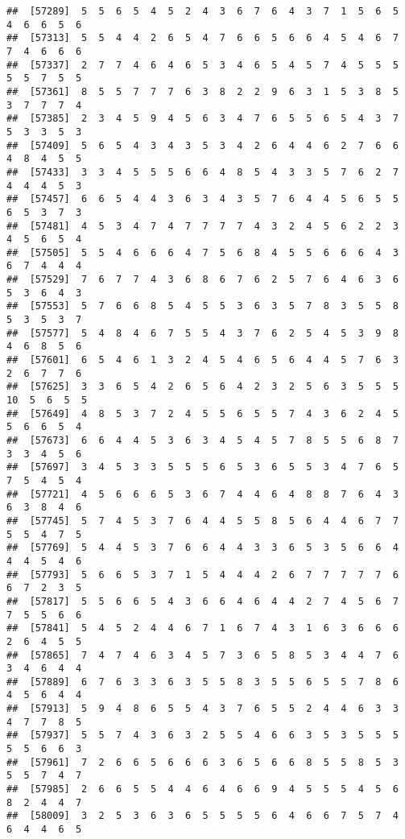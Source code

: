 \documentclass[
]{book}
\begin{document}
\begin{verbatim}
##  [57289]  5  5  6  5  4  5  2  4  3  6  7  6  4  3  7  1  5  6  5  4  6  6  5  6
##  [57313]  5  5  4  4  2  6  5  4  7  6  6  5  6  6  4  5  4  6  7  7  4  6  6  6
##  [57337]  2  7  7  4  6  4  6  5  3  4  6  5  4  5  7  4  5  5  5  5  5  7  5  5
##  [57361]  8  5  5  7  7  7  6  3  8  2  2  9  6  3  1  5  3  8  5  3  7  7  7  4
##  [57385]  2  3  4  5  9  4  5  6  3  4  7  6  5  5  6  5  4  3  7  5  3  3  5  3
##  [57409]  5  6  5  4  3  4  3  5  3  4  2  6  4  4  6  2  7  6  6  4  8  4  5  5
##  [57433]  3  3  4  5  5  5  6  6  4  8  5  4  3  3  5  7  6  2  7  4  4  4  5  3
##  [57457]  6  6  5  4  4  3  6  3  4  3  5  7  6  4  4  5  6  5  5  6  5  3  7  3
##  [57481]  4  5  3  4  7  4  7  7  7  7  4  3  2  4  5  6  2  2  3  4  5  6  5  4
##  [57505]  5  5  4  6  6  6  4  7  5  6  8  4  5  5  6  6  6  4  3  6  7  4  4  4
##  [57529]  7  6  7  7  4  3  6  8  6  7  6  2  5  7  6  4  6  3  6  5  3  6  4  3
##  [57553]  5  7  6  6  8  5  4  5  5  3  6  3  5  7  8  3  5  5  8  5  3  5  3  7
##  [57577]  5  4  8  4  6  7  5  5  4  3  7  6  2  5  4  5  3  9  8  4  6  8  5  6
##  [57601]  6  5  4  6  1  3  2  4  5  4  6  5  6  4  4  5  7  6  3  2  6  7  7  6
##  [57625]  3  3  6  5  4  2  6  5  6  4  2  3  2  5  6  3  5  5  5 10  5  6  5  5
##  [57649]  4  8  5  3  7  2  4  5  5  6  5  5  7  4  3  6  2  4  5  5  6  6  5  4
##  [57673]  6  6  4  4  5  3  6  3  4  5  4  5  7  8  5  5  6  8  7  3  3  4  5  6
##  [57697]  3  4  5  3  3  5  5  5  6  5  3  6  5  5  3  4  7  6  5  7  5  4  5  4
##  [57721]  4  5  6  6  6  5  3  6  7  4  4  6  4  8  8  7  6  4  3  6  3  8  4  6
##  [57745]  5  7  4  5  3  7  6  4  4  5  5  8  5  6  4  4  6  7  7  5  5  4  7  5
##  [57769]  5  4  4  5  3  7  6  6  4  4  3  3  6  5  3  5  6  6  4  4  4  5  4  6
##  [57793]  5  6  6  5  3  7  1  5  4  4  4  2  6  7  7  7  7  7  6  6  7  2  3  5
##  [57817]  5  5  6  6  5  4  3  6  6  4  6  4  4  2  7  4  5  6  7  7  5  5  6  6
##  [57841]  5  4  5  2  4  4  6  7  1  6  7  4  3  1  6  3  6  6  6  2  6  4  5  5
##  [57865]  7  4  7  4  6  3  4  5  7  3  6  5  8  5  3  4  4  7  6  3  4  6  4  4
##  [57889]  6  7  6  3  3  6  3  5  5  8  3  5  5  6  5  5  7  8  6  4  5  6  4  4
##  [57913]  5  9  4  8  6  5  5  4  3  7  6  5  5  2  4  4  6  3  3  4  7  7  8  5
##  [57937]  5  5  7  4  3  6  3  2  5  5  4  6  6  3  5  3  5  5  5  5  5  6  6  3
##  [57961]  7  2  6  6  5  6  6  6  3  6  5  6  6  8  5  5  8  5  3  5  5  7  4  7
##  [57985]  2  6  6  5  5  4  4  6  4  6  6  9  4  5  5  5  4  5  6  8  2  4  4  7
##  [58009]  3  2  5  3  6  3  6  5  5  5  5  6  4  6  6  7  5  7  4  6  4  4  6  5

\end{verbatim}
\end{document}
